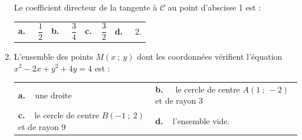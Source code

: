 \begin{enumerate}
Le coefficient directeur de la tangente à $\mathscr{C}$ au point d'abscisse 1 est :

\medskip

\begin{tabularx}{1.05\linewidth}{*{4}{X}}
\textbf{a.~~} $ \dfrac{1}{2}$ &\textbf{b.~~} $\dfrac{3}{4} $&\textbf{c.~~}$\dfrac{3}{2} $& \textbf{d.~~} $ 2 $.
\end{tabularx}

\item L'ensemble des points $M(x~;~y)$ dont les coordonnées vérifient l'équation $x^2-2x+y^2+4y=4$ est :

\medskip

\begin{tabularx}{1.05\linewidth}{*{2}{X}}
\textbf{a.~~}une droite $ $ &\textbf{b.~~} \small le cercle de centre $ A(1~;~-2)$ et de rayon 3\\\textbf{c.~~}\small le cercle de centre $ B(-1~;~2)$ et de rayon 9& \textbf{d.~~}l'ensemble vide.
\end{tabularx}
\end{enumerate}

\vspace{0,5cm}

